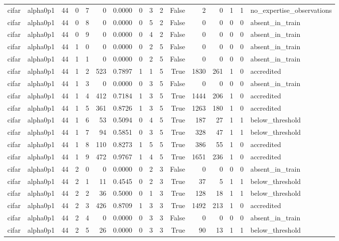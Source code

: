\begin{tabular}{llrrrrrrrrrrrrrl}
cifar & alpha0p1 & 44 & 0 & 7 & 0 & 0.0000 & 0 & 3 & 2 & False & 2 & 0 & 1 & 1 & no\_expertise\_observations \\
cifar & alpha0p1 & 44 & 0 & 8 & 0 & 0.0000 & 0 & 5 & 2 & False & 0 & 0 & 0 & 0 & absent\_in\_train \\
cifar & alpha0p1 & 44 & 0 & 9 & 0 & 0.0000 & 0 & 4 & 2 & False & 0 & 0 & 0 & 0 & absent\_in\_train \\
cifar & alpha0p1 & 44 & 1 & 0 & 0 & 0.0000 & 0 & 2 & 5 & False & 0 & 0 & 0 & 0 & absent\_in\_train \\
cifar & alpha0p1 & 44 & 1 & 1 & 0 & 0.0000 & 0 & 2 & 5 & False & 0 & 0 & 0 & 0 & absent\_in\_train \\
cifar & alpha0p1 & 44 & 1 & 2 & 523 & 0.7897 & 1 & 1 & 5 & True & 1830 & 261 & 1 & 0 & accredited \\
cifar & alpha0p1 & 44 & 1 & 3 & 0 & 0.0000 & 0 & 3 & 5 & False & 0 & 0 & 0 & 0 & absent\_in\_train \\
cifar & alpha0p1 & 44 & 1 & 4 & 412 & 0.7184 & 1 & 3 & 5 & True & 1444 & 206 & 1 & 0 & accredited \\
cifar & alpha0p1 & 44 & 1 & 5 & 361 & 0.8726 & 1 & 3 & 5 & True & 1263 & 180 & 1 & 0 & accredited \\
cifar & alpha0p1 & 44 & 1 & 6 & 53 & 0.5094 & 0 & 4 & 5 & True & 187 & 27 & 1 & 1 & below\_threshold \\
cifar & alpha0p1 & 44 & 1 & 7 & 94 & 0.5851 & 0 & 3 & 5 & True & 328 & 47 & 1 & 1 & below\_threshold \\
cifar & alpha0p1 & 44 & 1 & 8 & 110 & 0.8273 & 1 & 5 & 5 & True & 386 & 55 & 1 & 0 & accredited \\
cifar & alpha0p1 & 44 & 1 & 9 & 472 & 0.9767 & 1 & 4 & 5 & True & 1651 & 236 & 1 & 0 & accredited \\
cifar & alpha0p1 & 44 & 2 & 0 & 0 & 0.0000 & 0 & 2 & 3 & False & 0 & 0 & 0 & 0 & absent\_in\_train \\
cifar & alpha0p1 & 44 & 2 & 1 & 11 & 0.4545 & 0 & 2 & 3 & True & 37 & 5 & 1 & 1 & below\_threshold \\
cifar & alpha0p1 & 44 & 2 & 2 & 36 & 0.5000 & 0 & 1 & 3 & True & 128 & 18 & 1 & 1 & below\_threshold \\
cifar & alpha0p1 & 44 & 2 & 3 & 426 & 0.8709 & 1 & 3 & 3 & True & 1492 & 213 & 1 & 0 & accredited \\
cifar & alpha0p1 & 44 & 2 & 4 & 0 & 0.0000 & 0 & 3 & 3 & False & 0 & 0 & 0 & 0 & absent\_in\_train \\
cifar & alpha0p1 & 44 & 2 & 5 & 26 & 0.0000 & 0 & 3 & 3 & True & 90 & 13 & 1 & 1 & below\_threshold \\

\end{tabular}
